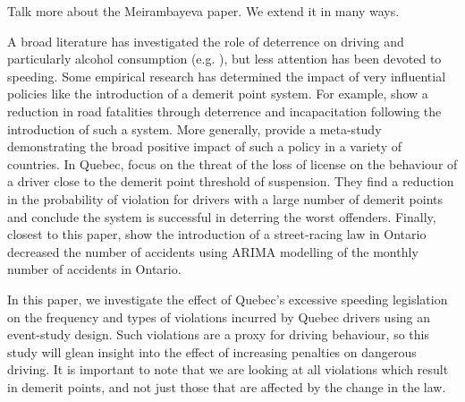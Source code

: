 {\Large Talk more about the Meirambayeva paper.
We extend it in many ways.}

A broad literature has investigated the role of deterrence on driving 
and particularly alcohol consumption 
(e.g. \citet{hansen2015}), 
but less attention has been devoted to speeding. 
Some empirical research has determined the impact of very influential policies 
like the introduction of a demerit point system. 
For example, 
\citet{bennedittiniNicita2009} 
show a reduction in road fatalities 
through deterrence and incapacitation following the introduction of such a system. 
More generally, 
\citet{castillocastro2012} 
provide a meta-study 
demonstrating the broad positive impact of such a policy in a variety of countries. 
In Quebec, 
\citet{dionneetal2011} 
focus on the threat of the loss of license 
on the behaviour of a driver close to the demerit point threshold of suspension. 
They find a reduction in the probability of violation for drivers 
with a large number of demerit points and conclude 
the system is successful in deterring the worst offenders. 
Finally, closest to this paper, 
\citet{meirambayeva2014} 
show the introduction of a street-racing law in Ontario decreased the number of accidents 
using ARIMA modelling of the monthly number of accidents in Ontario.
% 
%
% 


In this paper, we investigate the effect of Quebec’s excessive speeding legislation
 on the frequency and types of violations incurred by Quebec drivers 
using an event-study design. 
Such violations are a proxy for driving behaviour, 
so this study will glean insight into the effect of increasing penalties on dangerous driving. 
It is important to note that we are looking at all violations which result in demerit points, 
and not just those that are affected by the change in the law. 

